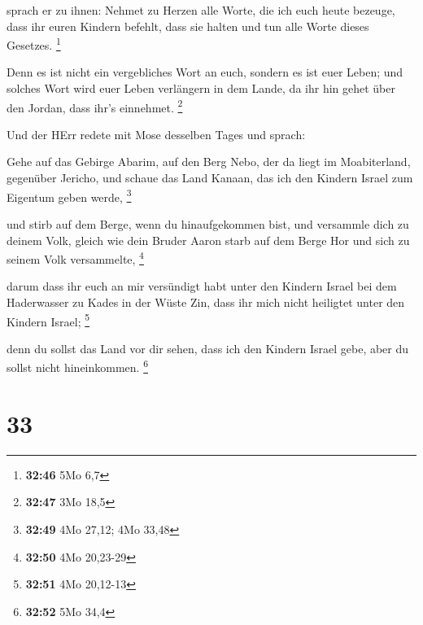  sprach er zu ihnen: Nehmet zu Herzen alle Worte, die ich
euch heute bezeuge, dass ihr euren Kindern befehlt, dass sie halten und
tun alle Worte dieses Gesetzes. \footnote{\textbf{32:46} 5Mo 6,7}

 Denn es ist nicht ein vergebliches Wort an euch, sondern
es ist euer Leben; und solches Wort wird euer Leben verlängern in dem
Lande, da ihr hin gehet über den Jordan, dass ihr's einnehmet.
\footnote{\textbf{32:47} 3Mo 18,5}

 Und der HErr redete mit Mose desselben Tages und sprach:

 Gehe auf das Gebirge Abarim, auf den Berg Nebo, der da
liegt im Moabiterland, gegenüber Jericho, und schaue das Land Kanaan,
das ich den Kindern Israel zum Eigentum geben werde, \footnote{\textbf{32:49}
  4Mo 27,12; 4Mo 33,48}

 und stirb auf dem Berge, wenn du hinaufgekommen bist,
und versammle dich zu deinem Volk, gleich wie dein Bruder Aaron starb
auf dem Berge Hor und sich zu seinem Volk versammelte, \footnote{\textbf{32:50}
  4Mo 20,23-29}

 darum dass ihr euch an mir versündigt habt unter den
Kindern Israel bei dem Haderwasser zu Kades in der Wüste Zin, dass ihr
mich nicht heiligtet unter den Kindern Israel; \footnote{\textbf{32:51}
  4Mo 20,12-13}

 denn du sollst das Land vor dir sehen, dass ich den
Kindern Israel gebe, aber du sollst nicht hineinkommen. \footnote{\textbf{32:52}
  5Mo 34,4}

\hypertarget{section-32}{%
\section{33}\label{section-32}}

